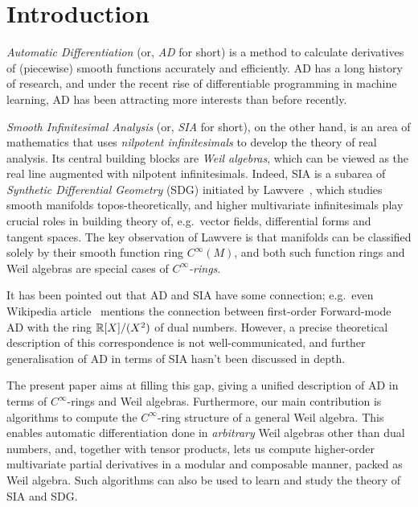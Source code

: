 \documentclass[runningheads]{llncs}
\begin{document}
\section{Introduction}\label{sec:intro}
\sloppy
\emph{Automatic Differentiation} (or, \emph{AD} for short) is a method to calculate derivatives of (piecewise) smooth functions accurately and efficiently.
AD has a long history of research, and under the recent rise of differentiable programming in machine learning, AD has been attracting more interests than before recently.

\emph{Smooth Infinitesimal Analysis} (or, \emph{SIA} for short), on the other hand, is an area of mathematics that uses \emph{nilpotent infinitesimals} to develop the theory of real analysis.
Its central building blocks are \emph{Weil algebras}, which can be viewed as the real line augmented with nilpotent infinitesimals.
Indeed, SIA is a subarea of \emph{Synthetic Differential Geometry} (SDG) initiated by Lawvere~\cite{lawvere1979categorical}, which studies smooth manifolds topos-theoretically, and higher multivariate infinitesimals play crucial roles in building theory of, e.g.\ vector fields, differential forms and tangent spaces.
The key observation of Lawvere is that manifolds can be classified solely by their smooth function ring $C^\infty(M)$, and both such function rings and Weil algebras are special cases of \emph{$C^\infty$-rings}.

It has been pointed out that AD and SIA have some connection; e.g.\ even Wikipedia article~\cite{Wikipedia:2021aa} mentions the connection between first-order Forward-mode AD with the ring $\mathbb{R}[X]/(X^2)$ of dual numbers.
However, a precise theoretical description of this correspondence is not well-communicated, and further generalisation of AD in terms of SIA hasn't been discussed in depth.

The present paper aims at filling this gap, giving a unified description of AD in terms of $C^\infty$-rings and Weil algebras.
Furthermore, our main contribution is algorithms to compute the $C^\infty$-ring structure of a general Weil algebra.
This enables automatic differentiation done in \emph{arbitrary} Weil algebras other than dual numbers, and, together with tensor products, lets us compute higher-order multivariate partial derivatives in a modular and composable manner, packed as Weil algebra.
Such algorithms can also be used to learn and study the theory of SIA and SDG.
\end{document}
